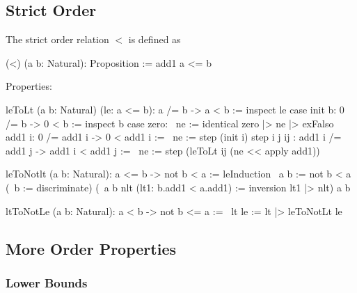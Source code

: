 \vskip 5mm
\subsection{Strict Order}

\noindent The strict order relation $<$ is defined as

\begin{alba}
  (<) (a b: Natural): Proposition :=
    add1 a <= b
\end{alba}

Properties:

\begin{alba}
    leToLt (a b: Natural) (le: a <= b): a /= b -> a < b :=
        inspect le case
            init b: 0 /= b -> 0 < b :=
                inspect b case
                    zero: \ ne := identical zero |> ne |> exFalso
                    add1 i: 0 /= add1 i -> 0 < add1 i :=
                        \ ne := step (init i)
            step i j ij
            : add1 i /= add1 j -> add1 i < add1 j :=
                \ ne :=
                    step (leToLt ij (ne << apply add1))
\end{alba}


\begin{alba}
    leToNotlt (a b: Natural): a <= b -> not b < a :=
        leInduction
            {\ a b := not b < a}
            (\ b := discriminate)
            (\ a b nlt (lt1: b.add1 < a.add1) :=
                inversion lt1 |> nlt)
            a
            b

    ltToNotLe (a b: Natural): a < b -> not b <= a :=
        \ lt le :=
            lt |> leToNotLt le
\end{alba}










\vskip 5mm
\subsection{More Order Properties}

\subsubsection{Lower Bounds}

